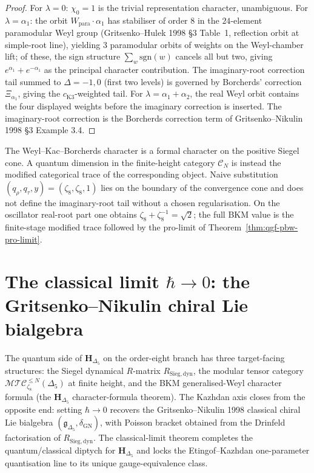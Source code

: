 \begin{proof}
For $\lambda = 0$: $\chi_0 = 1$ is the trivial representation character,
unambiguous. For $\lambda = \alpha_1$: the orbit
$W_{\mathrm{para}}\cdot\alpha_1$ has stabiliser of order $8$ in the
$24$-element paramodular Weyl group (Gritsenko--Hulek 1998 \S3
Table~1, reflection orbit at simple-root line), yielding $3$ paramodular
orbits of weights on the Weyl-chamber lift; of these, the sign
structure $\sum_w\mathrm{sgn}(w)$ cancels all but two, giving
$e^{\alpha_1} + e^{-\alpha_1}$ as the principal character contribution.
The imaginary-root correction tail summed to $\Delta = -1, 0$ (first
two levels) is governed by Borcherds' correction $\Xi_{\alpha_1}$,
giving the $c_{\mathrm{K3}}$-weighted tail. For
\(\lambda = \alpha_1 + \alpha_2\), the real Weyl orbit contains the four
displayed weights before the imaginary correction is inserted. The
imaginary-root correction is the Borcherds correction term of
Gritsenko--Nikulin 1998 \S3 Example 3.4.
\end{proof}

\begin{remark}
\label{rem:qgf-character-qdim}
The Weyl--Kac--Borcherds character is a formal character on the
positive Siegel cone. A quantum dimension in the finite-height category
\(\mathcal C_N\) is instead the modified categorical trace of the
corresponding object. Naive substitution
\((q_\rho,q_\tau,y)=(\zeta_8,\zeta_8,1)\) lies on the boundary of the
convergence cone and does not define the imaginary-root tail without a
chosen regularisation. On the oscillator real-root part one obtains
\(\zeta_8+\zeta_8^{-1}=\sqrt2\); the full BKM value is the finite-stage
modified trace followed by the pro-limit of
Theorem~\ref{thm:qgf-pbw-pro-limit}.
\end{remark}

\section{The classical limit \texorpdfstring{$\hbar \to 0$}{hbar -> 0}: the Gritsenko--Nikulin chiral Lie bialgebra}
\label{sec:qgf-kazhdan-classical}

The quantum side of \(\mathbf H_{\Delta_5}\) on the order-eight branch
has three target-facing structures: the Siegel dynamical \(R\)-matrix
$R_{\mathrm{Sieg,dyn}}$, the modular tensor category
\(\mathcal{MTC}_{\zeta_8}^{\leq N}(\Delta_5)\) at finite height, and the BKM generalised-Weyl
character formula (the $\mathbf H_{\Delta_5}$ character-formula theorem). The
Kazhdan axis closes from the opposite end: setting $\hbar\to 0$
recovers the Gritsenko--Nikulin 1998 classical chiral Lie bialgebra
$(\mathfrak g_{\Delta_5}, \delta_{\mathrm{GN}})$, with Poisson bracket
obtained from the Drinfeld factorisation of $R_{\mathrm{Sieg,dyn}}$.
The classical-limit theorem completes the quantum/classical diptych
for $\mathbf H_{\Delta_5}$ and locks the Etingof--Kazhdan one-parameter
quantisation line to its unique gauge-equivalence class.

